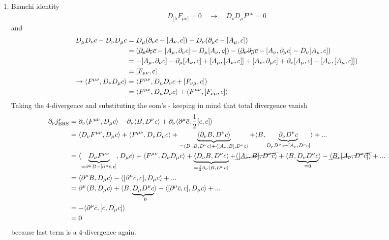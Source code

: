 \documentclass[10pt,a4paper]{article}
\theoremstyle{definition}
\begin{document}
\begin{enumerate}
\item Bianchi identity
\begin{align}
D_{[\lambda}F_{\mu\nu]}=0\quad\rightarrow\quad D_\nu D_\mu F^{\mu\nu}=0
\end{align}
and
\begin{align}
D_\mu D_\nu c- D_\nu D_\mu c
&=D_\mu(\partial_\nu c-[A_\nu,c])-D_\nu(\partial_\mu c-[A_\mu,c])\\
&=(\cancel{\partial_\mu\partial_\nu c}-[A_\mu,\partial_\nu c]-D_\mu[A_\nu,c])-(\cancel{\partial_\nu\partial_\mu c}-[A_\nu,\partial_\mu c]-D_\nu[A_\mu,c])\\
&=-[A_\mu,\partial_\nu c]-\partial_\mu[A_\nu,c]+[A_\mu,[A_\nu,c]]+[A_\nu,\partial_\mu c]+\partial_\nu[A_\mu,c]-[A_\nu,[A_\mu,c]])\\
%
&=[F_{\mu\nu},c]\\
\rightarrow  \langle F^{\mu\nu}, D_\nu D_\mu c\rangle
&=\langle F^{\mu\nu}, D_\mu D_\nu c+[F_{\nu\mu},c]\rangle\\
&=\langle F^{\mu\nu}, D_\mu D_\nu c\rangle+\langle F^{\mu\nu}, [F_{\nu\mu},c]\rangle
\end{align}
Taking the 4-divergence and substituting the eom's - keeping in mind that total divergence vanish
\begin{align}
\partial_\nu j^\nu_\text{BRS}
&=\partial_\nu \langle F^{\mu\nu}, D_\mu c\rangle
-\partial_\nu \langle B, D^\nu c\rangle
+\partial_\nu \langle\partial^\mu\bar{c},\frac{1}{2}[c,c]\rangle\\
&=\langle D_\nu F^{\mu\nu}, D_\mu c\rangle+\langle F^{\mu\nu}, D_\nu D_\mu c\rangle
+\underbrace{\langle \partial_\nu B, D^\nu c\rangle}_{=\langle D_\nu B, D^\nu c\rangle+\langle [A_\nu,B], D^\nu c\rangle}+\langle B,\underbrace{\partial_\nu D^\nu c}_{D_\nu D^\nu c-[A_\nu,D^\nu c]}\rangle+...\\
&=\langle \underbrace{D_\nu F^{\mu\nu}}_{=\partial^\mu B
-[\partial^\mu\bar{c},c]}, D_\mu c\rangle
+\langle F^{\mu\nu}, D_\nu D_\mu c\rangle
+\underbrace{\langle D_\nu B, D^\nu c\rangle}_{=\frac{1}{2}\partial_\nu\langle B, D^\nu c\rangle}
+\cancel{\langle [A_\nu,B], D^\nu c\rangle}
+\langle B,\underbrace{D_\nu D^\nu c}_{=0} \rangle 
-\cancel{\langle B,[A_\nu,D^\nu c]\rangle}+...\\
&=\langle \partial^\mu B, D_\mu c\rangle
-\langle [\partial^\mu\bar{c},c], D_\mu c\rangle+...\\
&=\partial^\mu\langle B, D_\mu c\rangle+\langle B, \underbrace{D_\mu D^\mu c}_{=0}\rangle
-\langle [\partial^\mu\bar{c},c], D_\mu c\rangle+...\\
&=-\langle \partial^\mu\bar{c},[c, D_\mu c]\rangle\\
&=0
\end{align}
because last term is a 4-divergence again.


\end{enumerate}
\end{document}
